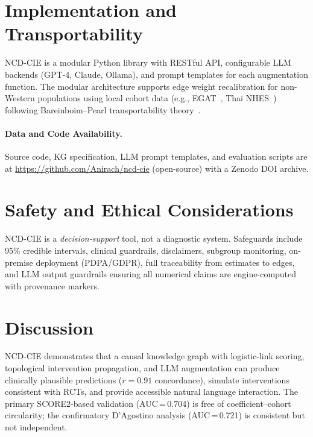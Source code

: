 \documentclass[runningheads]{llncs}
\begin{document}
\section{Implementation and Transportability}\label{sec:impl}

NCD-CIE is a modular Python library with RESTful API, configurable
LLM backends (GPT-4, Claude, Ollama), and prompt templates for each
augmentation function.
The modular architecture supports edge weight recalibration for
non-Western populations using local cohort data (e.g.,
EGAT~\cite{sritara2003egat}, Thai NHES~\cite{aekplakorn2011thai})
following Bareinboim--Pearl transportability
theory~\cite{bareinboim2016causal}.

\paragraph{Data and Code Availability.}
Source code, KG specification, LLM prompt templates, and evaluation
scripts are at
\url{https://github.com/Anirach/ncd-cie} (open-source) with a
Zenodo DOI archive.

\section{Safety and Ethical Considerations}\label{sec:ethics}

NCD-CIE is a \emph{decision-support} tool, not a diagnostic system.
Safeguards include 95\% credible intervals, clinical guardrails,
disclaimers, subgroup monitoring, on-premise deployment
(PDPA/GDPR), full traceability from estimates to edges, and
LLM output guardrails ensuring all numerical claims are
engine-computed with provenance markers.

\section{Discussion}\label{sec:discussion}

NCD-CIE demonstrates that a causal knowledge graph with logistic-link
scoring, topological intervention propagation, and LLM augmentation
can produce clinically plausible predictions ($r = 0.91$ concordance),
simulate interventions consistent with RCTs, and provide accessible
natural language interaction.
The primary SCORE2-based validation (AUC\,=\,0.704) is free of
coefficient--cohort circularity; the confirmatory D'Agostino analysis
(AUC\,=\,0.721) is consistent but not independent.
\end{document}
